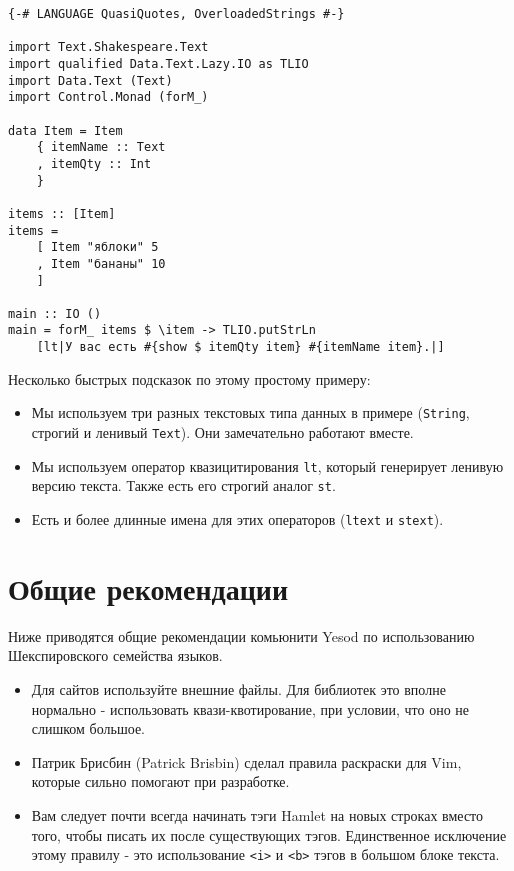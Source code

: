 \begin{lstlisting}
{-# LANGUAGE QuasiQuotes, OverloadedStrings #-}

import Text.Shakespeare.Text
import qualified Data.Text.Lazy.IO as TLIO
import Data.Text (Text)
import Control.Monad (forM_)

data Item = Item
    { itemName :: Text
    , itemQty :: Int
    }

items :: [Item]
items =
    [ Item "яблоки" 5
    , Item "бананы" 10
    ]

main :: IO ()
main = forM_ items $ \item -> TLIO.putStrLn
    [lt|У вас есть #{show $ itemQty item} #{itemName item}.|]
\end{lstlisting}

Несколько быстрых подсказок по этому простому примеру:
\begin{itemize}
\item Мы используем три разных текстовых типа данных в примере 
(\lstinline!String!, строгий и ленивый \lstinline!Text!). Они замечательно
работают вместе.
\item Мы используем оператор квазицитирования \lstinline!lt!, который генерирует
ленивую версию текста. Также есть его строгий аналог \lstinline!st!.
\item Есть и более длинные имена для этих операторов 
(\lstinline!ltext! и \lstinline!stext!).
\end{itemize}

\section{Общие рекомендации}

Ниже приводятся общие рекомендации комьюнити Yesod по использованию
Шекспировского семейства языков.

\begin{itemize}
\item Для сайтов используйте внешние файлы. Для библиотек это вполне 
нормально - использовать квази-квотирование, при условии, что оно не слишком большое.
\item Патрик Брисбин (Patrick Brisbin) сделал правила раскраски для Vim, 
которые сильно помогают при разработке.
\item Вам следует почти всегда начинать тэги Hamlet на новых строках вместо того,
чтобы писать их после существующих тэгов. Единственное исключение этому правилу - это
использование \lstinline!<i>! и \lstinline!<b>! тэгов в большом блоке текста.
\end{itemize}



